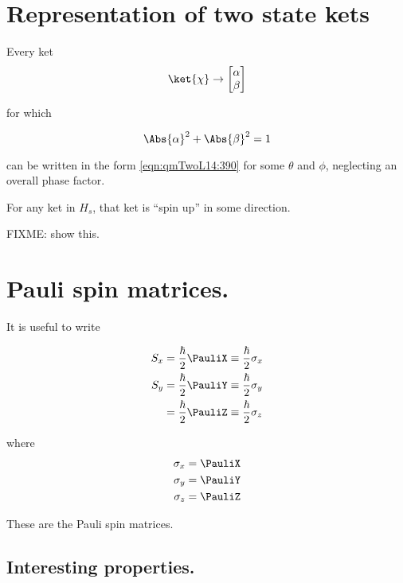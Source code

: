 \section{Representation of two state kets}

Every ket 
\begin{equation}\label{eqn:qmTwoL14:840}
\ket{\chi} \rightarrow 
\begin{bmatrix}
\alpha \\
\beta
\end{bmatrix}
\end{equation}

for which

\begin{equation}\label{eqn:qmTwoL14:430}
\Abs{\alpha}^2 + \Abs{\beta}^2 = 1
\end{equation}

can be written in the form \ref{eqn:qmTwoL14:390} for some $\theta$ and $\phi$, neglecting an overall phase factor.

For any ket in $H_s$, that ket is ``spin up'' in some direction.

FIXME: show this.

\section{Pauli spin matrices.}

It is useful to write

\begin{align}\label{eqn:qmTwoL14:450}
S_x 
&= \frac{\hbar}{2} \PauliX \equiv 
\frac{\hbar}{2} \sigma_x \\
S_y 
&= \frac{\hbar}{2} \PauliY \equiv 
\frac{\hbar}{2} \sigma_y \\
&= \frac{\hbar}{2} \PauliZ \equiv 
\frac{\hbar}{2} \sigma_z 
\end{align}

where
\begin{align}\label{eqn:qmTwoL14:470}
\sigma_x &= \PauliX \\
\sigma_y &= \PauliY \\
\sigma_z &= \PauliZ
\end{align}

These are the Pauli spin matrices.

\subsection{Interesting properties.}

